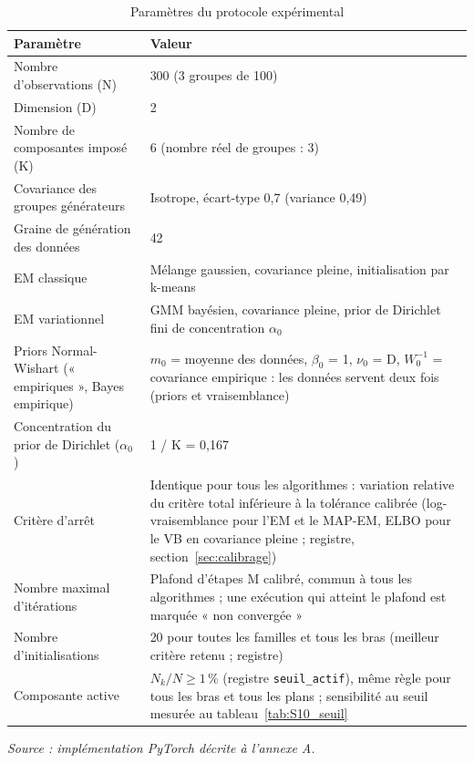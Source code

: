 \begin{table}[H]
\centering
\small
\setlength{\tabcolsep}{0.14cm}
\begin{tabular}{|p{7.42cm}|p{7.42cm}|}
\hline
\textbf{Paramètre} & \textbf{Valeur} \\
\hline
Nombre d'observations (N) & 300 (3 groupes de 100) \\
\hline
Dimension (D) & 2 \\
\hline
Nombre de composantes imposé (K) & 6 (nombre réel de groupes : 3) \\
\hline
Covariance des groupes générateurs & Isotrope, écart-type 0,7 (variance 0,49) \\
\hline
Graine de génération des données & 42 \\
\hline
EM classique & Mélange gaussien, covariance pleine, initialisation par k-means \\
\hline
EM variationnel & GMM bayésien, covariance pleine, prior de Dirichlet fini de concentration $\alpha _{0}$ \\
\hline
Priors Normal-Wishart (« empiriques », Bayes empirique) & $m_{0}$ = moyenne des données, $\beta _{0}$ = 1, $\nu _{0}$ = D, $W_{0}^{-1}$ = covariance empirique : les données servent deux fois (priors et vraisemblance) \\
\hline
Concentration du prior de Dirichlet ($\alpha _{0}$) & 1 / K = 0,167 \\
\hline
Critère d'arrêt & Identique pour tous les algorithmes : variation relative du critère total inférieure à la tolérance calibrée (log-vraisemblance pour l'EM et le MAP-EM, ELBO pour le VB en covariance pleine ; registre, section~\ref{sec:calibrage}) \\
\hline
Nombre maximal d'itérations & Plafond d'étapes M calibré, commun à tous les algorithmes ; une exécution qui atteint le plafond est marquée « non convergée » \\
\hline
Nombre d'initialisations & 20 pour toutes les familles et tous les bras (meilleur critère retenu ; registre) \\
\hline
Composante active & $N_k/N \geq 1\,\%$ (registre \texttt{seuil\_actif}), même règle pour tous les bras et tous les plans ; sensibilité au seuil mesurée au tableau~\ref{tab:S10_seuil} \\
\hline
\end{tabular}
\caption{Paramètres du protocole expérimental}
\label{tab:2_4}
\end{table}
\emph{Source : implémentation PyTorch décrite à l'annexe A.}

